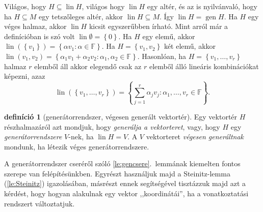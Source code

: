 \documentclass[9pt, showtrims]{memoir}
\makeatletter
\renewenvironment{proof}[1][\proofname]
    {\par\pushQED{\qed}%
    \normalfont \topsep6\p@\@plus6\p@\relax
    \trivlist
    \item[\hskip\labelsep
        \itshape
    #1\@addpunct{:}]\ignorespaces}
    {\popQED\endtrivlist\@endpefalse}
\theoremstyle{plain}
\theoremstyle{remark}
\theoremstyle{definition}
\newtheorem{definition}[proposition]{definíció}
\renewcommand{\mathbf}{\mathbb}
\DeclareMathOperator{\lin}{lin}
\DeclareMathOperator{\gen}{gen}
\makeatother
\begin{document}
\begin{proof}
    Világos, hogy $H\subseteq \lin H$, világos hogy $\lin H$ egy altér, 
    és az is nyilvánvaló, hogy ha $H\subseteq M$ egy tetszőleges altér, 
    akkor $\lin H\subseteq M$.
    Így $\lin H=\gen H$.
\end{proof}
Ha $H$ egy véges halmaz, akkor $\lin H$ kicsit egyszerűbben írható.
Mint arról már a definícióban is szó volt $\lin \emptyset=\left\{ 0 \right\}$.
Ha $H$ egy elemű, akkor $\lin (\left\{ v_1 \right\})=\left\{ \alpha v_1:\alpha\in\mathbf{F} \right\}$.
Ha $H=\left\{ v_1,v_2 \right\}$ két elemű, akkor
$\lin({v_1,v_2})=\left\{ \alpha_1v_1+\alpha_2v_2:\alpha_1,\alpha_2\in\mathbf{F} \right\}$.
Hasonlóan, ha $H=\left\{ v_1,\dots,v_r \right\}$ halmaz $r$ elemből áll akkor elegendő csak az $r$ elemből álló lineáris kombinációkat képezni, azaz
\[
    \lin \left( \left\{ v_1,\dots,v_r \right\} \right)
    =
    \left\{ \sum_{j=1}^r\alpha_jv_j:\alpha_1,\dots,v_r\in\mathbf{F} \right\}.
\]
\begin{definition}[generátorrendszer, végesen generált vektortér]
    Egy vektortér $H$ részhalmazáról azt mondjuk, hogy \emph{generálja a vektorteret},
    vagy, hogy $H$ egy \emph{generátorrendszere} $V$-nek, ha $\lin H=V$.
    A $V$ vektorteret \emph{végesen generáltnak} mondunk, ha létezik véges generátorrendszere.
\end{definition}

A generátorrendszer cseréről szóló \ref{le:gencsere}.~lemmának kiemelten fontos szerepe van felépítésünkben.
Egyrészt használjuk majd a Steinitz-lemma (\ref{le:Steinitz}) igazolásában, 
másrészt ennek segítségével tisztázzuk majd azt a kérdést,
hogy hogyan alakulnak egy vektor ,,koordinátái'', ha a vonatkoztatási rendszert változtatjuk.
\end{document}
